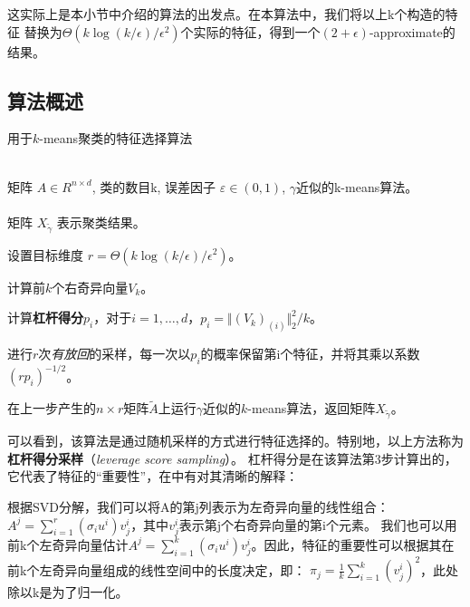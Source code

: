 \documentclass{ctexart}
\begin{document}
    这实际上是本小节中介绍的算法的出发点。在本算法中，我们将以上k个构造的特征
    替换为$\Theta(k \log(k / \epsilon) / \epsilon^2)$个实际的特征，得到一个$(2+\epsilon)$-approximate的结果。
    
    \subsection{算法概述}
    \begin{algorithm}[htb]
    \caption{用于$k$-means聚类的特征选择算法}
    \label{SVD}
        \begin{algorithmic}[1] %
        \REQUIRE ~~\\ %
            矩阵 $ A \in R^{n \times d}$, 类的数目k, 误差因子 $\varepsilon \in (0, 1)$, $\gamma$近似的k-means算法。 \\
        \ENSURE ~~\\ %
            矩阵 $ X_{\tilde{\gamma}} $ 表示聚类结果。

        \STATE 设置目标维度 $ r = \Theta(k \log(k / \epsilon) / \epsilon^2)$。

        \STATE 计算前$k$个右奇异向量$V_k$。

        \STATE 计算\textbf{杠杆得分}$p_i$，对于$i=1, \dots, d$，$p_i = \Vert (V_k)_{(i)} \Vert_2^2 / k$。
        \label{compls}

        \STATE 进行$r$次\textit{有放回}的采样，每一次以$p_i$的概率保留第i个特征，并将其乘以系数$(rp_i)^{-1/2}$。

        \STATE 在上一步产生的$n \times r$矩阵$\tilde{A}$上运行$\gamma$近似的$k$-means算法，返回矩阵$X_{\tilde{\gamma}}$。

        \end{algorithmic}
    \end{algorithm}

    可以看到，该算法是通过随机采样的方式进行特征选择的。特别地，以上方法称为\textbf{杠杆得分采样}（\textit{leverage score sampling}）。
    杠杆得分是在该算法第3步计算出的，它代表了特征的“重要性”，在\cite{Mahoney2009cur}中有对其清晰的解释：

    根据SVD分解，我们可以将A的第j列表示为左奇异向量的线性组合：$A^j=\sum_{i=1}^{r} (\sigma_i u^i)v_j^i$，其中$v_j^i$表示第j个右奇异向量的第i个元素。
    我们也可以用前k个左奇异向量估计$A^j=\sum_{i=1}^{k} (\sigma_i u^i)v_j^i$。因此，特征的重要性可以根据其在前k个左奇异向量组成的线性空间中的长度决定，即：
    $\pi_j = \frac{1}{k} \sum_{i=1}^{k} (v_j^i)^2$，此处除以k是为了归一化。
\end{document}
